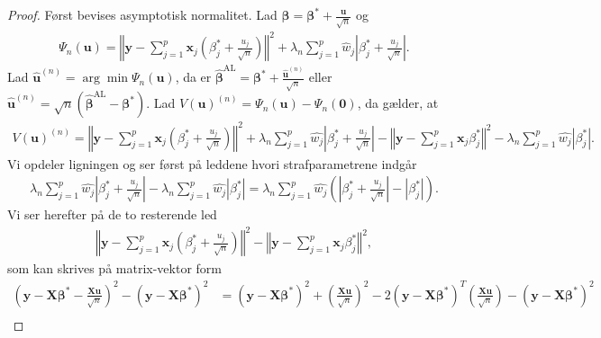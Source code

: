 \begin{proof}
Først bevises asymptotisk normalitet. Lad $\boldsymbol{\beta}=\boldsymbol{\beta}^{*} +\frac{\textbf{u}}{\sqrt{n}}$ og
\begin{align*}
\Psi_n(\textbf{u})=\left\Vert \mathbf{y}-\sum_{j=1}^p \textbf{x}_j \left( \beta_j^{*} +\frac{u_j}{\sqrt{n}} \right) \right\Vert^2 + \lambda_n \sum_{j=1}^p \hat{w}_j \left\vert \beta_j^{*} + \frac{u_j}{\sqrt{n}} \right\vert.
\end{align*}
Lad $\hat{\textbf{u}}^{(n)}=\arg \min \Psi_n(\textbf{u})$, da er $\hat{\boldsymbol{\beta}}^{{\text{AL}}}=\boldsymbol{\beta}^{*} + \frac{\hat{\boldsymbol{u}}^{(n)}}{\sqrt{n}}$ eller $\hat{\boldsymbol{u}}^{(n)}=\sqrt{n}\left(\hat{\boldsymbol{\beta}}^{\text{AL}}-\boldsymbol{\beta}^{*}\right)$.
Lad $V(\mathbf{u})^{(n)}=\Psi_n(\textbf{u}) - \Psi_n(\textbf{0})$, da gælder, at
\begin{align*}
V(\mathbf{u})^{(n)}= \left\Vert \textbf{y} - \sum_{j=1}^p \textbf{x}_j \left( \beta_j^{*} + \frac{u_j}{\sqrt{n}} \right) \right\Vert^2 +
\lambda_n \sum_{j=1}^p \hat{w_j} \left\vert \beta_j^{*} + \frac{u_j}{\sqrt{n}} \right\vert 
-
\left\Vert \textbf{y} - \sum_{j=1}^p \textbf{x}_j \beta_j^{*} \right\Vert^2 - \lambda_n \sum_{j=1}^p \hat{w_j} \left\vert \beta_j^{*} \right\vert. 
\end{align*}
Vi opdeler ligningen og ser først på leddene hvori strafparametrene indgår
\begin{align*}
\lambda_n \sum_{j=1}^p \hat{w_j} \left\vert \beta_j^{*} + \frac{u_j}{\sqrt{n}} \right\vert- \lambda_n \sum_{j=1}^p \hat{w_j} \left\vert \beta_j^{*} \right\vert 
= \lambda_n \sum_{j=1}^p \hat{w_j} \left( \left\vert \beta_j^{*} + \frac{u_j}{\sqrt{n}} \right\vert - \left\vert \beta_j^{*} \right\vert
\right).
\end{align*}
Vi ser herefter på de to resterende led
\begin{align*}
\left\Vert \textbf{y} - \sum_{j=1}^p \textbf{x}_j \left( \beta_j^{*} + \frac{u_j}{\sqrt{n}} \right) \right\Vert^2 -\left\Vert \textbf{y} - \sum_{j=1}^p \textbf{x}_j \beta_j^{*} \right\Vert^2,
\end{align*}
som kan skrives på matrix-vektor form
\begin{align*}
\left(
\textbf{y}-\textbf{X}\boldsymbol{\beta}^{*} -\frac{\textbf{X}\textbf{u}}{\sqrt{n}}
\right)^2 - \left( \textbf{y} - \textbf{X} \boldsymbol{\beta}^{*} \right)^2  & = \left( \textbf{y} - \textbf{X} \boldsymbol{\beta}^{*} \right)^2 + \left( \frac{\mathbf{X}\mathbf{u}}{\sqrt{n}} \right)^2- 2 \left( \textbf{y} - \textbf{X} \boldsymbol{\beta}^{*} \right)^T \left( \frac{\mathbf{X}\mathbf{u}}{\sqrt{n}} \right) - \left( \textbf{y} - \textbf{X} \boldsymbol{\beta}^{*} \right)^2 \\

\end{align*}
\end{proof}
